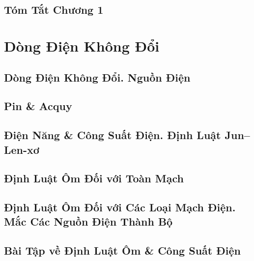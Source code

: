 \documentclass[oneside]{book}
\numberwithin{equation}{section}
\begin{document}

\section{Tóm Tắt Chương 1}


\chapter{Dòng Điện Không Đổi}

\section{Dòng Điện Không Đổi. Nguồn Điện}


\section{Pin \& Acquy}


\section{Điện Năng \& Công Suất Điện. Định Luật Jun--Len-xơ}


\section{Định Luật Ôm Đối với Toàn Mạch}


\section{Định Luật Ôm Đối với Các Loại Mạch Điện. Mắc Các Nguồn Điện Thành Bộ}


\section{Bài Tập về Định Luật Ôm \& Công Suất Điện}
\end{document}
